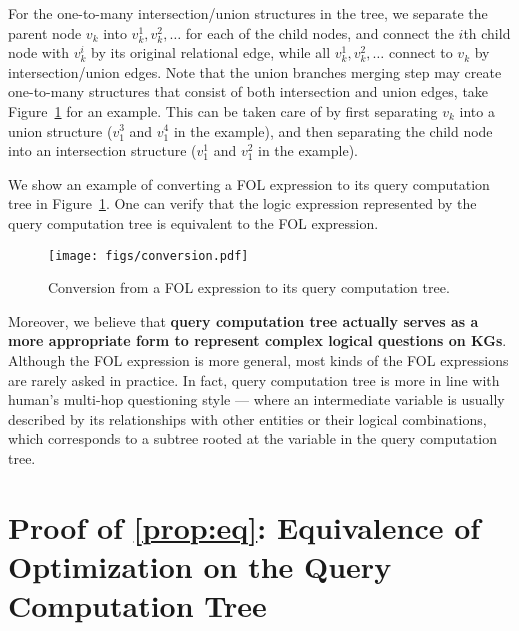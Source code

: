 For the one-to-many intersection/union structures in the tree, we separate the parent node $v_k$ into $v^1_k, v^2_k, \dots$ for each of the child nodes, and connect the $i$th child node with $v^i_k$ by its original relational edge, while all $v^1_k, v^2_k, \dots$ connect to $v_k$ by intersection/union edges.
Note that the union branches merging step may create one-to-many structures that consist of both intersection and union edges, take Figure~\ref{fig:conversion} for an example.
This can be taken care of by first separating $v_k$ into a union structure ($v^3_1$ and $v^4_1$ in the example), and then separating the child node into an intersection structure ($v^1_1$ and $v^2_1$ in the example).

We show an example of converting a FOL expression to its query computation tree in Figure~\ref{fig:conversion}. One can verify that the logic expression represented by the query computation tree is equivalent to the FOL expression.

\begin{figure}[htbp]
\centering
\texttt{[image: figs/conversion.pdf]}
\caption{Conversion from a FOL expression to its query computation tree.}
\label{fig:conversion}
\end{figure}

Moreover, we believe that \textbf{query computation tree actually serves as a more appropriate form to represent complex logical questions on KGs}.
Although the FOL expression is more general, most kinds of the FOL expressions are rarely asked in practice.
In fact, query computation tree is more in line with human's multi-hop questioning style --- where an intermediate variable is usually described by its relationships with other entities or their logical combinations, which corresponds to a subtree rooted at the variable in the query computation tree.

\section{Proof of \cref{prop:eq}: Equivalence of Optimization on the Query Computation Tree}
\label{app:prop}

